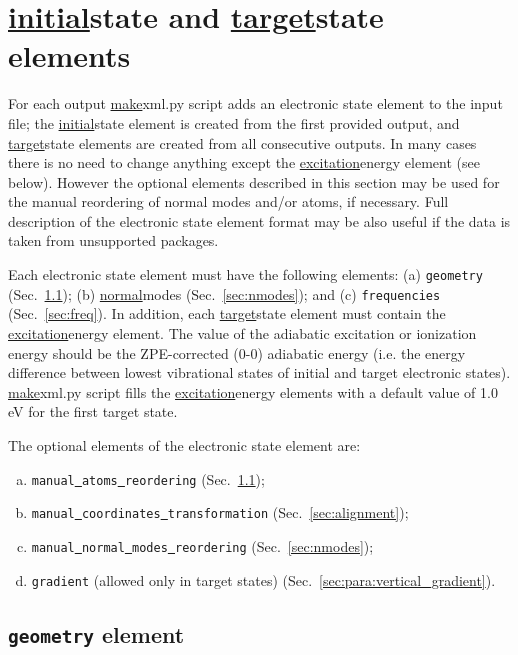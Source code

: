 \documentclass[11pt]{article}
\begin{document}
\section{\ul{initial}{state} and \ul{target}{state} elements}
\label{sec:elstates}

For each \ai output \ul{make}{xml.py} script adds an electronic state element 
to the input  \xml file; the \ul{initial}{state} element is created from the first provided output, 
and \ul{target}{state} elements are created from all consecutive outputs.
In many cases there is no need to change anything except the \ul{excitation}{energy} element (see below).
However the optional elements described in this section may be used for 
the manual reordering of normal modes and/or atoms, if necessary.
Full description of the electronic state element format may be also useful 
if the data is taken from unsupported \ai packages.

Each electronic state element must have the following elements: 
(a) {\tt geometry} (Sec.~\ref{sec:geometry});
(b) \ul{normal}{modes} (Sec.~\ref{sec:nmodes});
and (c) {\tt frequencies} (Sec.~\ref{sec:freq}). 
In addition, each \ul{target}{state} element must contain the \ul{excitation}{energy} element. The value of the adiabatic excitation or ionization energy 
should be the ZPE-corrected (0-0) adiabatic energy (i.e. the energy difference between lowest vibrational states of 
initial and target electronic states). \ul{make}{xml.py} script fills the \ul{excitation}{energy} elements with a default value
of 1.0 eV for the first target state.

The optional elements of the electronic state element are:
\begin{enumerate}[(a)]
\item {\tt manual\underline{~}atoms\underline{~}reordering} (Sec.~\ref{sec:geometry});
\item {\tt manual\underline{~}coordinates\underline{~}transformation} (Sec.~\ref{sec:alignment});
\item {\tt manual\underline{~}normal\underline{~}modes\underline{~}reordering} (Sec.~\ref{sec:nmodes});
\item {\tt gradient} (allowed only in target states) (Sec.~\ref{sec:para:vertical_gradient}).
\end{enumerate}

\subsection{\texttt{geometry} element}
\label{sec:geometry}
\end{document}

